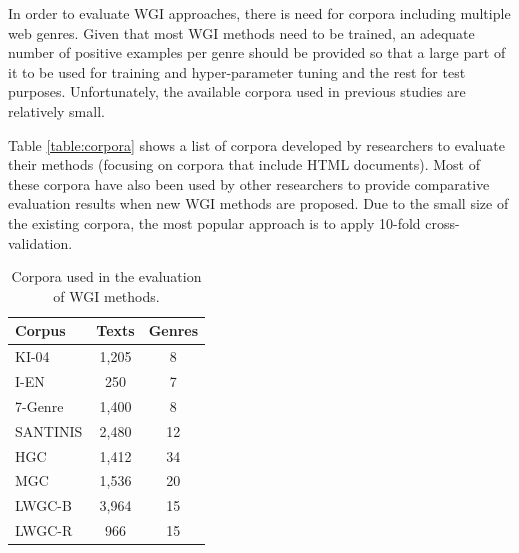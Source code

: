 \begin{itemize}
\begin{end}
In order to evaluate WGI approaches, there is need for corpora including multiple web genres. Given that most WGI methods need to be trained, an adequate number of positive examples per genre should be provided so that a large part of it to be used for training and hyper-parameter tuning and the rest for test purposes. Unfortunately, the available corpora used in previous studies are relatively small. 

Table \ref{table:corpora} shows a list of corpora developed by researchers to evaluate their methods (focusing on corpora that include HTML documents). Most of these corpora have also been used by other researchers to provide comparative evaluation results when new WGI methods are proposed. Due to the small size of the existing corpora, the most popular approach is to apply 10-fold cross-validation.

\begin{table}[t]
	\center
	\caption {Corpora used in the evaluation of WGI methods.}
	\begin{tabular}{lcc}
		\hline
		Corpus & Texts & Genres \\
		\hline
        KI-04 & 1,205 & 8 \\
        I-EN & 250 & 7 \\
        7-Genre & 1,400 & 8 \\
        SANTINIS & 2,480 & 12 \\
        HGC & 1,412 & 34 \\
        MGC & 1,536 & 20 \\
        LWGC-B & 3,964 & 15 \\
        LWGC-R & 966 & 15 \\
  		\hline
	\end{tabular}
\end{table}


\end{end}
\end{itemize}
